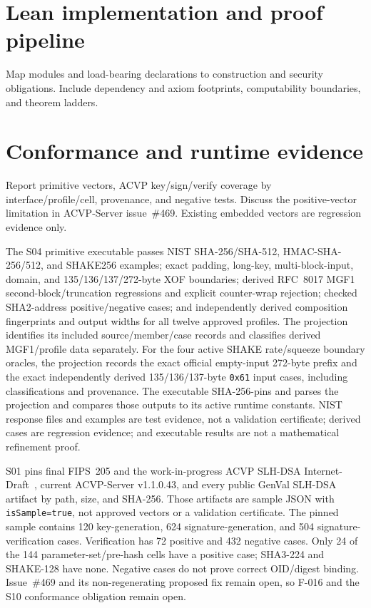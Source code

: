 \documentclass[11pt]{article}
\begin{document}
\section{Lean implementation and proof pipeline}
Map modules and load-bearing declarations to construction and security obligations. Include
dependency and axiom footprints, computability boundaries, and theorem ladders.

\section{Conformance and runtime evidence}
Report primitive vectors, ACVP key/sign/verify coverage by interface/profile/cell, provenance, and
negative tests. Discuss the positive-vector limitation in ACVP-Server issue~\#469. Existing embedded
vectors are regression evidence only.

The S04 primitive executable passes NIST SHA-256/SHA-512, HMAC-SHA-256/512, and SHAKE256 examples;
exact padding, long-key, multi-block-input, domain, and 135/136/137/272-byte XOF boundaries; derived
RFC~8017 MGF1 second-block/truncation regressions and explicit counter-wrap rejection; checked
SHA2-address positive/negative cases; and independently derived composition fingerprints and output
widths for all twelve approved profiles. The projection identifies its included source/member/case
records and classifies derived MGF1/profile data separately. For the four active SHAKE rate/squeeze
boundary oracles, the
projection records the exact official empty-input 272-byte prefix and the exact independently
derived 135/136/137-byte
\texttt{0x61} input cases, including classifications and provenance. The executable SHA-256-pins
and parses the projection and compares those outputs to its active runtime constants. NIST response
files and examples are test evidence, not a validation certificate; derived cases are regression
evidence; and executable results are not a mathematical refinement proof.

S01 pins final FIPS~205 and the work-in-progress ACVP SLH-DSA Internet-Draft~\cite{acvpSlhdsa},
current ACVP-Server v1.1.0.43, and every public GenVal SLH-DSA artifact by path, size, and SHA-256.
Those artifacts are sample JSON with \texttt{isSample=true}, not approved vectors or a validation
certificate. The pinned sample contains 120 key-generation, 624 signature-generation, and 504
signature-verification cases. Verification has 72 positive and 432 negative cases. Only 24 of the
144 parameter-set/pre-hash cells have a positive case; SHA3-224 and SHAKE-128 have none. Negative
cases do not prove correct OID/digest binding. Issue~\#469 and its non-regenerating proposed fix
remain open, so F-016 and the S10 conformance obligation remain open.
\end{document}
